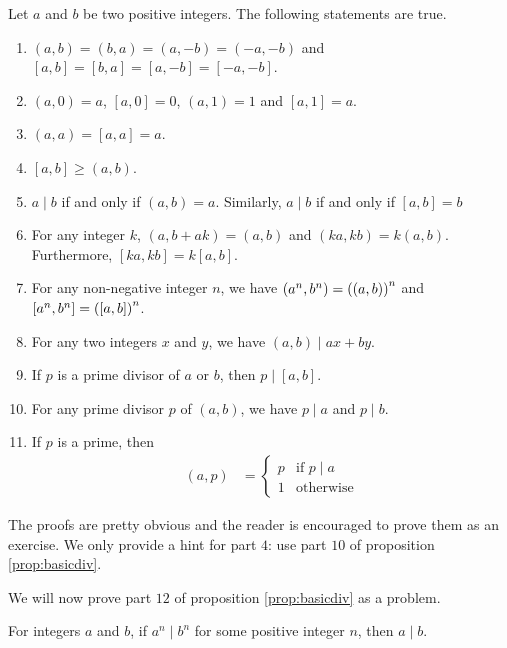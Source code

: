\begin{proposition}\label{prop:basicgcd}
	Let $a$ and $b$ be two positive integers. The following statements are true.
	\begin{enumerate}
		\item 	$(a, b) = (b, a) = (a, -b) = (-a, -b)$ and $[a, b]=[b, a] = [a, -b] = [-a, -b]$.
		\item 	$(a,0)=a$, $[a,0]=0$, $(a,1)=1$ and $[a,1]=a$.
		\item 	$(a,a)=[a,a] = a$.
		\item   $[a,b] \geq (a,b)$.
		\item	$a\mid b$ if and only if $(a,b)=a$. Similarly, $a\mid b$ if and only if $[a,b]=b$
		\item   For any integer $k$, $ (a, b+ak) = (a, b)$ and $(ka,kb)=k(a,b)$. Furthermore, $[ka,kb]=k[a,b]$.
		\item   For any non-negative integer $n$, we have $(a^n,b^n)=\left((a,b)\right)^n$ and $[a^n,b^n]=\left([a,b]\right)^n$.
		\item 	For any two integers $x$ and $y$, we have $(a,b)\mid ax+by$.
		\item 	If $p$ is a prime divisor of $a$ or $b$, then $p\mid [a,b]$.
		\item 	For any prime divisor $p$ of $(a, b)$, we have $p\mid a$ and $p\mid b$.
		\item 	If $p$ is a prime, then
		\begin{align*}
			(a,p) & =
			\begin{cases}
				p & \mbox{if } p\mid a\\
				1 & \mbox{otherwise}
			\end{cases}
		\end{align*}
	\end{enumerate}
\end{proposition}

The proofs are pretty obvious and the reader is encouraged to prove them as an exercise. We only provide a hint for part $4$: use part $10$ of proposition \eqref{prop:basicdiv}.

We will now prove part $12$ of proposition \eqref{prop:basicdiv} as a problem.

\begin{problem}
	For integers $a$ and $b$, if $a^n \mid b^n$ for some positive integer $n$, then $a\mid b$.
\end{problem}

